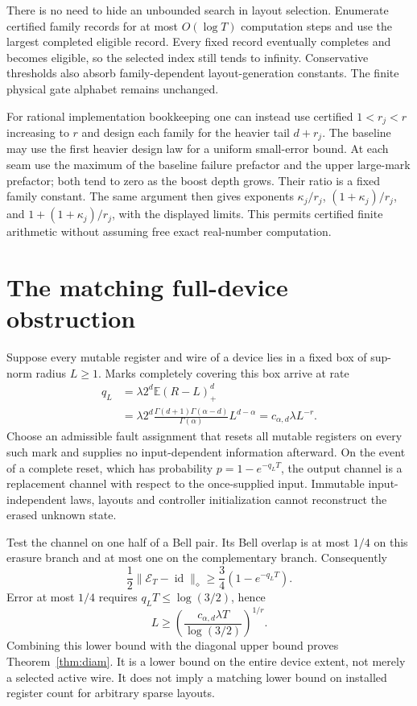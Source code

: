\documentclass[11pt]{article}
\begin{document}
There is no need to hide an unbounded search in layout selection.
Enumerate certified family records for at most $O(\log T)$ computation
steps and use the largest completed eligible record. Every fixed record
eventually completes and becomes eligible, so the selected index still
tends to infinity. Conservative thresholds also absorb family-dependent
layout-generation constants. The finite physical gate alphabet remains
unchanged.

For rational implementation bookkeeping one can instead use certified
$1<r_j<r$ increasing to $r$ and design each family for the heavier tail
$d+r_j$. The baseline may use the first heavier design law for a uniform
small-error bound. At each seam use the maximum of the baseline failure
prefactor and the upper large-mark prefactor; both tend to zero as the
boost depth grows. Their ratio is a fixed family constant. The same
argument then gives exponents $\kappa_j/r_j$,
$(1+\kappa_j)/r_j$, and $1+(1+\kappa_j)/r_j$, with the displayed limits.
This permits certified finite arithmetic without assuming free exact
real-number computation.

\section{The matching full-device obstruction}

Suppose every mutable register and wire of a device lies in a fixed
box of sup-norm radius $L\geq1$. Marks completely covering this box
arrive at rate
\begin{align}
 q_L
 &=\lambda 2^d\mathbb E(R-L)_+^d\\
 &=\lambda 2^d
   \frac{\Gamma(d+1)\Gamma(\alpha-d)}{\Gamma(\alpha)}
   L^{d-\alpha}
 =c_{\alpha,d}\lambda L^{-r}.
\end{align}
Choose an admissible fault assignment that resets all mutable registers
on every such mark and supplies no input-dependent information afterward.
On the event of a complete reset, which has probability
$p=1-e^{-q_LT}$, the output channel is a replacement channel with
respect to the once-supplied input. Immutable input-independent laws,
layouts and controller initialization cannot reconstruct the erased
unknown state.

Test the channel on one half of a Bell pair. Its Bell overlap is at most
$1/4$ on this erasure branch and at most one on the complementary branch.
Consequently
\[
 \frac12\|\mathcal E_T-\operatorname{id}\|_\diamond
 \geq \frac34(1-e^{-q_LT}).
\]
Error at most $1/4$ requires $q_LT\leq\log(3/2)$, hence
\[
 L\geq
 \left(\frac{c_{\alpha,d}\lambda T}{\log(3/2)}\right)^{1/r}.
\]
Combining this lower bound with the diagonal upper bound proves
Theorem~\ref{thm:diam}. It is a lower bound on the entire device extent,
not merely a selected active wire. It does not imply a matching lower
bound on installed register count for arbitrary sparse layouts.
\end{document}
